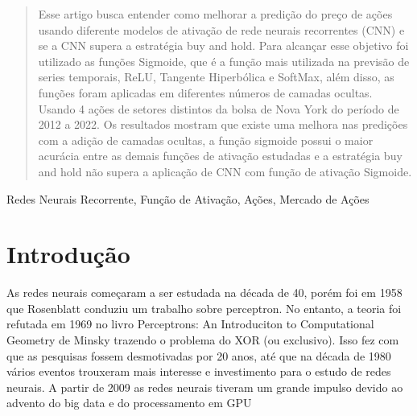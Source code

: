 \documentclass[preprint,12pt,authoryear]{elsarticle}
\begin{document}
\begin{frontmatter}
\begin{abstract}
Esse artigo busca entender como melhorar a predição do preço de ações usando diferente modelos de ativação de rede neurais recorrentes (CNN) e se a CNN supera a estratégia buy and hold. Para alcançar esse objetivo foi utilizado as funções Sigmoide, que é a função mais utilizada na previsão de series temporais, ReLU, Tangente Hiperbólica e SoftMax, além disso, as funções foram aplicadas em diferentes números de camadas ocultas. Usando 4 ações de setores distintos da bolsa de Nova York do período de 2012 a 2022. Os resultados mostram que existe uma melhora nas predições com a adição de camadas ocultas, a função sigmoide possui o maior acurácia entre as demais funções de ativação estudadas e a estratégia buy and hold não supera a aplicação de CNN com função de ativação Sigmoide.
\end{abstract}




\begin{keyword}
Redes Neurais Recorrente, Função de Ativação, Ações, Mercado de Ações



\end{keyword}

\end{frontmatter}


\section{Introdução}
\label{sec:introduction}

As redes neurais começaram a ser estudada na década de 40, porém foi em 1958 que Rosenblatt conduziu um trabalho sobre perceptron. No entanto, a teoria foi refutada em 1969 no livro Perceptrons: An Introduciton to Computational Geometry de Minsky trazendo o problema do XOR (ou exclusivo). Isso fez com que as pesquisas fossem desmotivadas por 20 anos, até que na década de 1980 vários eventos trouxeram mais interesse e investimento para o estudo de redes neurais. A partir de 2009 as redes neurais tiveram um grande impulso devido ao advento do big data e do processamento em GPU \cite{macukow2016}
\end{document}
